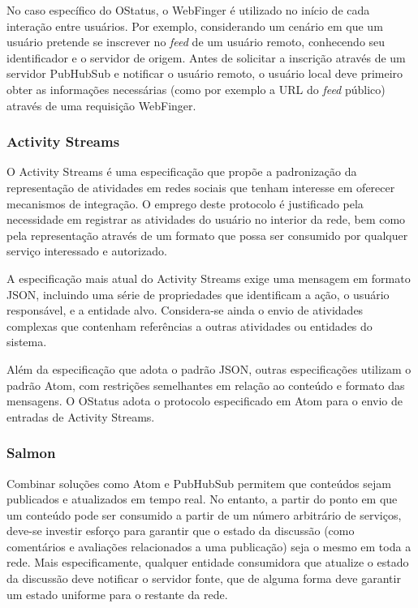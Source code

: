 
No caso específico do OStatus, o WebFinger é utilizado no início de cada interação
entre usuários. Por exemplo, considerando um cenário em que um usuário pretende se
inscrever no \textit{feed} de um usuário remoto, conhecendo seu identificador e o
servidor de origem. Antes de solicitar a inscrição através de um servidor PubHubSub e
notificar o usuário remoto, o usuário local deve primeiro obter as informações
necessárias (como por exemplo a URL do \textit{feed} público) através de uma
requisição  WebFinger.

\subsubsection{Activity Streams}


O Activity Streams é uma especificação que propõe a padronização da representação de
atividades em redes sociais que tenham interesse em oferecer mecanismos de
integração. O emprego deste protocolo é justificado pela necessidade em registrar as
atividades do usuário no interior da rede, bem como pela representação através de um
formato que possa ser consumido por qualquer serviço interessado e autorizado.

A especificação mais atual do Activity Streams exige uma mensagem em formato JSON,
incluindo uma série de propriedades que identificam a ação, o usuário responsável, e
a entidade alvo. Considera-se ainda o envio de atividades complexas que contenham
referências a outras atividades ou entidades do sistema. 

Além da especificação que adota o padrão JSON, outras especificações utilizam o
padrão Atom, com restrições semelhantes em relação ao conteúdo e formato das
mensagens. O OStatus adota o protocolo especificado em Atom para o envio de entradas
de Activity Streams.

\subsubsection{Salmon}


Combinar soluções como Atom e PubHubSub permitem que conteúdos sejam publicados e
atualizados em tempo real. No entanto, a partir do ponto em que um conteúdo pode ser
consumido a partir de um número arbitrário de serviços, deve-se investir esforço para
garantir que o estado da discussão (como comentários e avaliações relacionados a uma
publicação) seja o mesmo em toda a rede. Mais especificamente, qualquer entidade
consumidora que atualize o estado da discussão deve notificar o servidor fonte, que
de alguma forma deve garantir um estado uniforme para o restante da rede.

